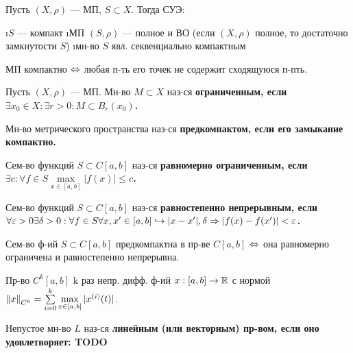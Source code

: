 \begin{thm}
Пусть $(X, \rho)$ --- МП, $S \subset X$. Тогда СУЭ:
\begin{enumerate}
\i $S$ --- компакт
\i МП $(S, \rho)$ --- полное и ВО (если $(X, \rho)$ полное, то достаточно замкнутости $S$)
\i мн-во $S$ явл. секвенциально компактным
\end{enumerate}
\end{thm}

\begin{thm}
МП компактно $\Leftrightarrow$ любая п-ть его точек не содержит сходящуюся п-пть.
\end{thm}

\begin{defn}
Пусть $(X, \rho)$ --- МП. Мн-во $M \subset X$ наз-ся \bf{ограниченным}, если $\exists x_0 \in X: \exists r > 0: M \subset B_r(x_0)$.
\end{defn}

\begin{defn}
Мн-во метрического пространства наз-ся \bf{предкомпактом}, если его замыкание компактно.
\end{defn}

\begin{defn}
Сем-во функций $S \subset C[a, b]$ наз-ся \bf{равномерно ограниченным}, если $\exists c: \forall f \in S \max\limits_{x \in [a, b]} |f(x)| \le c$.
\end{defn}

\begin{defn}
Сем-во функций $S \subset C[a, b]$ наз-ся \bf{равностепенно непрерывным}, если $\forall \varepsilon > 0 \exists \delta > 0: \forall f \in S \forall x, x' \in [a, b] \hookrightarrow |x-x'| , \delta \Rightarrow |f(x)-f(x')| < \varepsilon$.
\end{defn}

\begin{thm}
Сем-во ф-ий $S \subset C[a, b]$ предкомпактна в пр-ве $C[a, b]$ $\Leftrightarrow$ она равномерно ограничена и равностепенно непрерывна.
\end{thm}

\begin{defn}
Пр-во $C^k[a, b]$ k раз непр. дифф. ф-ий $x:[a, b] \rightarrow \mathbb{R}$ с нормой $\left\lVert x\right\rVert_{C^k} = \sum\limits_{i=0}^k \max\limits_{x \in [a, b]} |x^{(i)}(t)|$.
\end{defn}

\begin{defn}
Непустое мн-во $L$ наз-ся \bf{линейным} (или \bf{векторным}) пр-вом, если оно удовлетворяет:
TODO
\end{defn}


